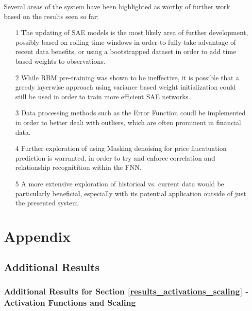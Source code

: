 \documentclass[a4paper,11pt,oneside]{article}
\theoremstyle{plain}
\theoremstyle{definition}
\begin{document}
Several areas of the system have been highlighted as worthy of further work based on the results seen so far: 
\begin{itemize}
	\item [1] The updating of SAE models is the most likely area of further development, possibly based on rolling time windows in order to fully take advantage of recent data benefits, or using a bootstrapped dataset in order to add time based weights to observations.
	\item [2] While RBM pre-training was shown to be ineffective, it is possible that a greedy layerwise approach using variance based weight initialization could still be used in order to train more efficient SAE networks.
	\item [3] Data processing methods such as the Error Function coudl be implemented in order to better deali with outliers, which are often prominent in financial data.
	\item [4] Further exploration of using Masking denoising for price flucatuation prediction is warranted, in order to try and enforce correlation and relationship recognitition within the FNN.
	\item [5] A more extensive exploration of historical vs. current data would be particularly beneficial, especially with its potential application outside of just the presented system.
\end{itemize}

\newpage
\section{Appendix}\label{Appendix}

\subsection{Additional Results}

\subsubsection{Additional Results for Section \ref{results_activations_scaling} - Activation Functions and Scaling }\label{results_activations_appendix}
\end{document}

